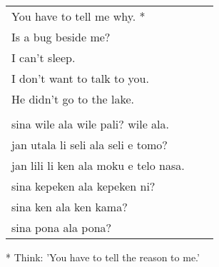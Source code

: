 \begin{supertabular}{p{5,5cm}|ll}
You have to tell me why. *  &&   \\ %
Is a bug beside me?  &&    \\ %
I can't sleep.  &&    \\ %
I don't want to talk to you.  &&    \\ %
He didn't go to the lake.   &&   \\ %
 && \\ %
sina wile ala wile pali? wile ala.  &&    \\ %
jan utala li seli ala seli e tomo?   &&   \\ %
jan lili li ken ala moku e telo nasa.   &&   \\ %
sina kepeken ala kepeken ni?  &&    \\ %
sina ken ala ken kama?   &&   \\ %
sina pona ala pona? &&   \\ %
\end{supertabular} 

* Think: 'You have to tell the reason to me.' 

